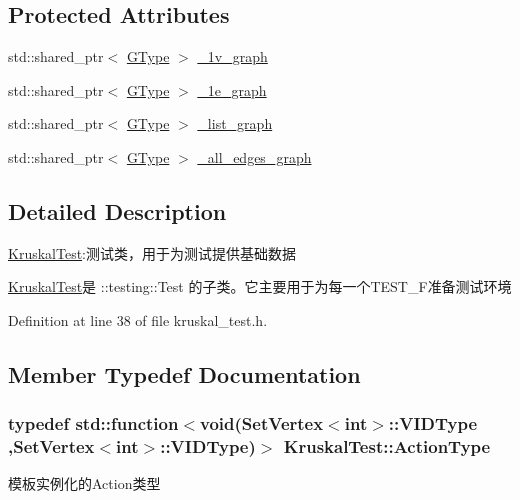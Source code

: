 \subsection*{Protected Attributes}
\begin{DoxyCompactItemize}
\item 
std\+::shared\+\_\+ptr$<$ \hyperlink{class_kruskal_test_a4cf4187bb360392a6e5829dacdf6fd6c}{G\+Type} $>$ \hyperlink{class_kruskal_test_a10424b1b5e9d63288d1751ee0e6115b4}{\+\_\+1v\+\_\+graph}
\item 
std\+::shared\+\_\+ptr$<$ \hyperlink{class_kruskal_test_a4cf4187bb360392a6e5829dacdf6fd6c}{G\+Type} $>$ \hyperlink{class_kruskal_test_ac4ef5fe84afa9d1774edd0f0d8e31e48}{\+\_\+1e\+\_\+graph}
\item 
std\+::shared\+\_\+ptr$<$ \hyperlink{class_kruskal_test_a4cf4187bb360392a6e5829dacdf6fd6c}{G\+Type} $>$ \hyperlink{class_kruskal_test_ac63161fae446d5ec15c82562d81b0d45}{\+\_\+list\+\_\+graph}
\item 
std\+::shared\+\_\+ptr$<$ \hyperlink{class_kruskal_test_a4cf4187bb360392a6e5829dacdf6fd6c}{G\+Type} $>$ \hyperlink{class_kruskal_test_a70183c9dedc39d09d71da4b3cecb59a4}{\+\_\+all\+\_\+edges\+\_\+graph}
\end{DoxyCompactItemize}


\subsection{Detailed Description}
\hyperlink{class_kruskal_test}{Kruskal\+Test}\+:测试类，用于为测试提供基础数据 

{\ttfamily \hyperlink{class_kruskal_test}{Kruskal\+Test}}是 {\ttfamily \+::testing\+::\+Test} 的子类。它主要用于为每一个{\ttfamily T\+E\+S\+T\+\_\+\+F}准备测试环境 

Definition at line 38 of file kruskal\+\_\+test.\+h.



\subsection{Member Typedef Documentation}
\hypertarget{class_kruskal_test_aa93c0a0f0cb0efdaeb56ea76b6861bef}{}
\subsubsection[{Action\+Type}]{\setlength{\rightskip}{0pt plus 5cm}typedef std\+::function$<$void({\bf Set\+Vertex}$<$int$>$\+::V\+I\+D\+Type ,{\bf Set\+Vertex}$<$int$>$\+::V\+I\+D\+Type)$>$ {\bf Kruskal\+Test\+::\+Action\+Type}}\label{class_kruskal_test_aa93c0a0f0cb0efdaeb56ea76b6861bef}
模板实例化的\+Action类型 

